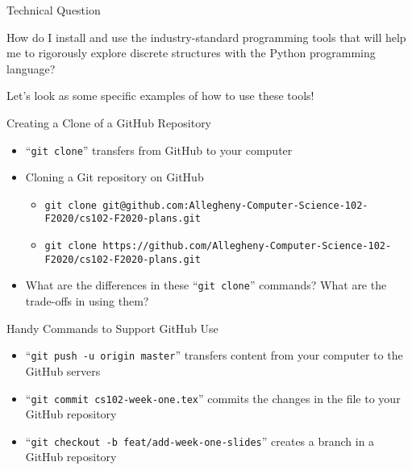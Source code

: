 \documentclass[14pt,aspectratio=169]{beamer}
\begin{document}
%
\begin{frame}{Technical Question}
  \begin{center}
    {\large How do I install and use the industry-standard programming tools that will
      help me to rigorously explore discrete structures with the Python
    programming language?}
  \end{center}
  \vspace{2ex}
  \begin{center}
    \small Let's look as some specific examples of how to use these tools!
  \end{center}
\end{frame}

%
\begin{frame}{Creating a Clone of a GitHub Repository}
  \setlength{\leftmarginii}{0.5cm}
  \begin{itemize}
    \item ``{\tt git clone}'' transfers from GitHub to your computer
    \item Cloning a Git repository on GitHub
      {\tiny
        \begin{itemize}
          \item {\tt git clone git@github.com:Allegheny-Computer-Science-102-F2020/cs102-F2020-plans.git}
          \item {\tt git clone https://github.com/Allegheny-Computer-Science-102-F2020/cs102-F2020-plans.git}
        \end{itemize}
      }
    \item What are the differences in these ``{\tt git clone}'' commands? What are the trade-offs in using them?
  \end{itemize}
\end{frame}

%
\begin{frame}{Handy Commands to Support GitHub Use}
  \begin{itemize}
    \item ``{\tt git push -u origin master}'' transfers content from your computer
      to the GitHub servers
    \item ``{\tt git commit cs102-week-one.tex}'' commits the changes in the
      file to your GitHub repository
    \item ``{\tt git checkout -b feat/add-week-one-slides}'' creates a branch in
      a GitHub repository
  \end{itemize}
\end{frame}
\end{document}
